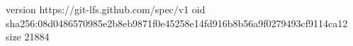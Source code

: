 version https://git-lfs.github.com/spec/v1
oid sha256:08d0486570985e2b8eb9871f0e45258e14fd916b8b56a9f0279493cf9114ca12
size 21884
